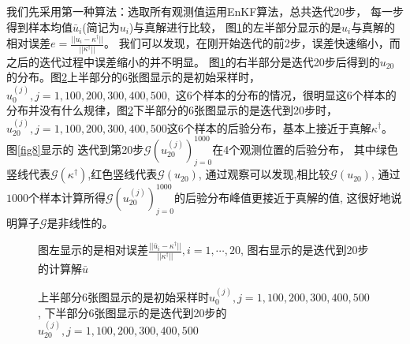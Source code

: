\documentclass[a4paper,12pt,oneside,CJK]{cctbook}
\theoremstyle{definition}
\numberwithin{equation}{section}
\begin{document}
我们先采用第一种算法：选取所有观测值运用EnKF算法，总共迭代20步，
每一步得到样本均值$\bar{u}_i$(简记为$u_i$)与真解进行比较，
图\ref{fig6}的左半部分显示的是$u_i$与真解的相对误差$e=\frac{||u_i-\kappa^{\dagger}||}{||\kappa^{\dagger}||}$。
我们可以发现，在刚开始迭代的前2步，误差快速缩小，而之后的迭代过程中误差缩小的并不明显。
图\ref{fig6}的右半部分是迭代20步后得到的$u_{20}$的分布。图\ref{fig7}上半部分的6张图显示的是初始采样时，$u_0^{(j)},j=1,100,200,300,400,500,$
这6个样本的分布的情况，很明显这6个样本的分布并没有什么规律，图\ref{fig7}下半部分的6张图显示的是迭代到20步时，
$u_{20}^{(j)},j=1,100,200,300,400,500$这6个样本的后验分布，基本上接近于真解$\kappa^{\dagger}$。图\ref{fig8}显示的
迭代到第20步$\mathcal{G}(u_{20}^{(j)})_{j=0}^{1000}$在4个观测位置的后验分布，
其中绿色竖线代表$\mathcal{G}(\kappa^{\dagger})$,红色竖线代表$\mathcal{G}(u_{20})$,
通过观察可以发现,相比较$\mathcal{G}(u_{20})$,
通过$1000$个样本计算所得$\mathcal{G}(u_{20}^{(j)})_{j=0}^{1000}$的后验分布峰值更接近于真解的值,
这很好地说明算子$\mathcal{G}$是非线性的。


\begin{figure}
\caption{图左显示的是相对误差$\frac{||\bar{u}_i-\kappa^{\dagger}||}{||\kappa^{\dagger}||},i=1,\cdots,20$,
图右显示的是迭代到20步的计算解$\bar{u}$}\label{fig6}
\end{figure}

\begin{figure}
\caption{上半部分6张图显示的是初始采样时$u_0^{(j)},j=1,100,200,300,400,500$,
下半部分6张图显示的是迭代到20步的$u_{20}^{(j)},j=1,100,200,300,400,500$}\label{fig7}
\end{figure}
\end{document}
